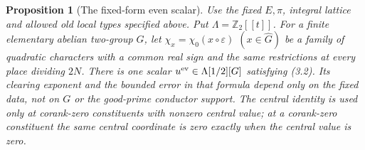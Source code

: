 \documentclass[11pt]{article}
\newtheorem{proposition}[theorem]{Proposition}
\theoremstyle{definition}
\theoremstyle{remark}
\newcommand{\Z}{\mathbb Z}
\begin{document}
\begin{proposition}[The fixed-form even scalar]\label{ex:sec7-even-scalar}
Use the fixed $E,\pi$, integral lattice and allowed old local types
specified above. Put $\Lambda=\Z_2[[t]]$. For a finite elementary
abelian two-group $G$, let $\chi_x=\chi_0(x\circ\varepsilon)$
$(x\in\widehat G)$ be a family of quadratic characters with a common
real sign and the same restrictions at every place dividing $2N$.
There is one scalar $u^{\rm ev}\in\Lambda[1/2][G]$ satisfying (3.2).
Its clearing exponent and the bounded error in that formula depend
only on the fixed data, not on $G$ or the good-prime conductor support.
The central identity is used only at corank-zero constituents with
nonzero central value; at a corank-zero constituent the same central
coordinate is zero exactly when the central value is zero.
\end{proposition}
\end{document}
